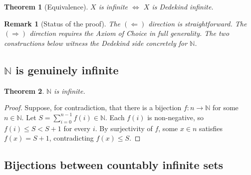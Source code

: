 \documentclass[11pt]{article}
\theoremstyle{defstyle}
\theoremstyle{thmstyle}
\newtheorem{theorem}{Theorem}[section]
\theoremstyle{notstyle}
\newtheorem*{remark}{Remark}
\theoremstyle{cautionstyle}
\newcommand{\N}{\mathbb{N}}
\begin{document}
\begin{thmbox}
\begin{theorem}[Equivalence]
$X$ is infinite $\iff$ $X$ is Dedekind infinite.
\end{theorem}
\end{thmbox}

\begin{notebox}
\begin{remark}[Status of the proof]
The $(\Leftarrow)$ direction is straightforward.  The $(\Rightarrow)$
direction requires the Axiom of Choice in full generality.  The two
constructions below witness the Dedekind side concretely for $\N$.
\end{remark}
\end{notebox}

\subsection{\texorpdfstring{$\N$}{N} is genuinely infinite}

\begin{thmbox}
\begin{theorem}
$\N$ is infinite.
\end{theorem}
\begin{proof}
Suppose, for contradiction, that there is a bijection $f \colon n \to \N$
for some $n \in \N$.  Let $S = \sum_{i=0}^{n-1} f(i) \in \N$.  Each $f(i)$
is non-negative, so $f(i) \leq S < S + 1$ for every $i$.  By
surjectivity of $f$, some $x \in n$ satisfies $f(x) = S + 1$,
contradicting $f(x) \leq S$.
\end{proof}
\end{thmbox}

\subsection{Bijections between countably infinite sets}
\end{document}
